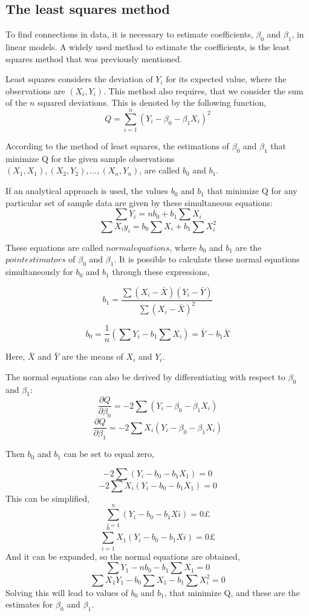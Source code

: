 \subsection{The least squares method}
	To find connections in data, it is necessary to estimate coefficients, $\beta_0$ and $\beta_1$, in linear models. 
	A widely used method to estimate the coefficients, is the least squares method that was previously mentioned. 
	
	Least squares considers the deviation of $Y_i$ for  its expected value, where the observations are $(X_i, Y_i)$. 
	This method also requires, that we consider the sum of the $n$ squared deviations.
	This is denoted by the following function,
	$$Q=\sum_{i=1}^{n}(Y_i-\beta_0 - \beta_1 X_i)^2$$
	
	According to the method of least squares, the estimations of $\beta_0$ and $\beta_1$ that minimize Q for the given sample observations $(X_1,X_1), (X_2,Y_2), ..., (X_n,Y_n)$, are called $b_0$ and $b_1$.  
	
	If an analytical approach is used, the values $b_0$ and $b_1$ that minimize Q for any particular set of sample data are given by these simultaneous equations: 
	$$\sum Y_i =n b_0 +b_1 \sum X_i$$
	$$\sum X_i y_i = b_0 \sum X_i + b_1 \sum X_i^2$$
	
	These equations are called $normal  equations$, where $b_0$ and $b_1$ are the $point estimators$ of $\beta_0$ and $\beta_1$. It is possible to calculate these normal equations simultaneously for $b_0$ and $b_1$ through these expressions,
	
	$$b_1 = \frac{\sum (X_i - \bar{X}) (Y_i - \bar{Y})}{\sum (X_i - \bar{X})^2}$$
	
	$$b_0 = \frac{1}{n} (\sum Y_i - b_1 \sum X_i ) = \bar{Y} - b_1 \bar{X}$$
	
	Here, $\bar{X}$ and $\bar{Y}$ are the means of $X_i$ and $Y_i$.
	
	The normal equations can also be derived by differentiating with respect to $\beta_0$ and $\beta_1$:
	$$\frac{\partial Q}{\partial \beta_0}=-2 \sum (Y_i - \beta_0 - \beta_1 X_i)$$
	$$\frac{\partial Q} {\partial \beta_1} = -2 \sum X_i (Y_i - \beta_0 - \beta_1 X_i)$$
	
	Then $b_0$ and $b_1$ can be set to equal zero, 
	
	$$-2 \sum (Y_i - b_0 - b_1 X_1)=0$$
	$$-2\sum X_i(Y_i - b_0 - b_1 X_1)=0$$
	This can be simplified, 
	$$\sum_{i=1}^{n} (Y_i - b_0 - b_1 Xi)=0£$$
	$$\sum_{i=1}^{n} X_1(Y_i - b_0 - b_1 Xi)=0£$$
	And it can be expanded, so the normal equations are obtained, 
	$$\sum Y_1 - n b_0 - b_1 \sum X_1 =0$$
	$$\sum X_1 Y_1  - b_0 \sum X_1 - b_1 \sum X_i^2 =0$$
	Solving this will lead to values of $b_0$ and $b_1$, that minimize Q, and these are the estimates for $\beta_0$ and $\beta_1$. 
	
